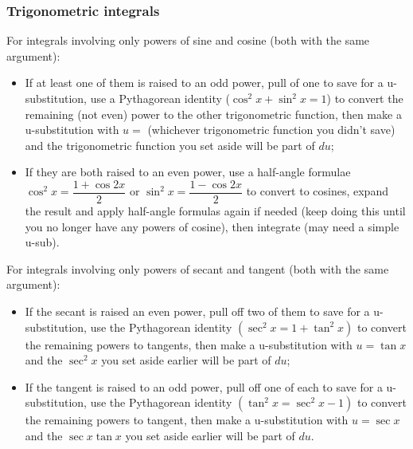 \subsubsection*{Trigonometric integrals}
\par 
For integrals involving only powers of sine and cosine (both with the same argument):
\begin{itemize}
    \item If at least one of them is raised to an odd power, pull of one to save for a u-substitution, use a Pythagorean identity \mbox{($\cos^2 x + \sin^2 x = 1$)} to convert the remaining (not even) power to the other trigonometric function, then make a u-substitution with $u =$ (whichever trigonometric function you didn't save) and the trigonometric function you set aside will be part of $du$;
    \item If they are both raised to an even power, use a half-angle formulae \mbox{$\cos^2 x = \dfrac{1 + \cos 2x}{2}$} or \mbox{$\sin^2 x = \dfrac{1-\cos 2x}{2}$} to convert to cosines, expand the result and apply half-angle formulas again
    if needed (keep doing this until you no longer have any powers of cosine), then integrate (may need a simple u-sub).
\end{itemize}
\par 
For integrals involving only powers of secant and tangent (both with the same argument):
\begin{itemize}
    \item If the secant is raised an even power, pull off two of them to save for a u-substitution, use the Pythagorean identity \mbox{$(\sec^2 x = 1 + \tan^2 x)$} to convert the remaining powers to tangents, then make a u-substitution with $u = \tan x$ and the $\sec^2 x$ you set aside earlier will be part of $du$;
    \item If the tangent is raised to an odd power, pull off one of each to save for a u-substitution, use the Pythagorean identity \mbox{$(\tan^2 x = \sec^2 x - 1)$} to convert the remaining powers to tangent, then make a u-substitution with $u = \sec x$ and the $\sec x \tan x$ you set aside earlier will be part of $du$.
\end{itemize}
